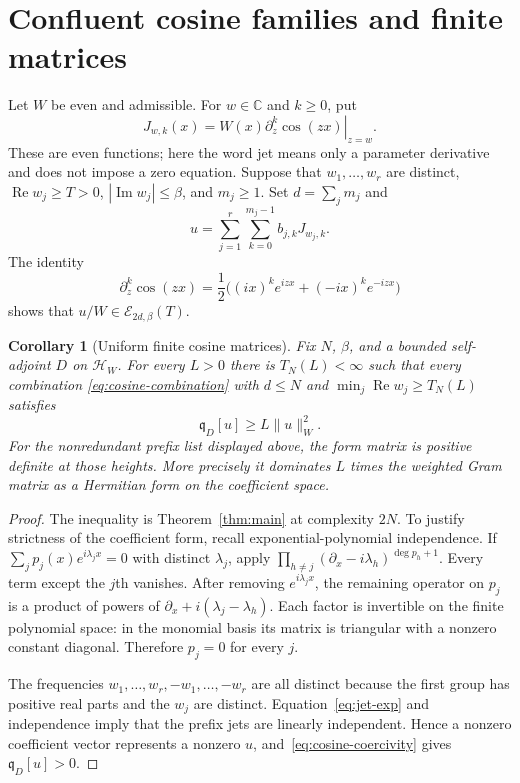 \documentclass[11pt]{article}
\newtheorem{corollary}[theorem]{Corollary}
\theoremstyle{definition}
\theoremstyle{remark}
\newcommand{\C}{\mathbb C}
\newcommand{\HH}{\mathcal H_W}
\newcommand{\qD}{\mathfrak q_D}
\newcommand{\norm}[1]{\lVert #1\rVert}
\DeclareMathOperator{\Rea}{Re}
\DeclareMathOperator{\Ima}{Im}
\begin{document}
\section{Confluent cosine families and finite matrices}\label{sec:cosine}

Let $W$ be even and admissible. For $w\in\C$ and $k\ge0$, put
\begin{equation}\label{eq:jets}
 J_{w,k}(x)=W(x)\left.\partial_z^k\cos(zx)\right|_{z=w}.
\end{equation}
These are even functions; here the word jet means only a parameter
derivative and does not impose a zero equation. Suppose that
$w_1,\ldots,w_r$ are distinct, $\Rea w_j\ge T>0$,
$|\Ima w_j|\le\beta$, and $m_j\ge1$. Set $d=\sum_jm_j$ and
\begin{equation}\label{eq:cosine-combination}
 u=\sum_{j=1}^r\sum_{k=0}^{m_j-1}b_{j,k}J_{w_j,k}.
\end{equation}
The identity
\begin{equation}\label{eq:jet-exp}
 \partial_z^k\cos(zx)=\frac12\bigl((ix)^ke^{izx}+(-ix)^ke^{-izx}\bigr)
\end{equation}
shows that $u/W\in\mathcal E_{2d,\beta}(T)$.

\begin{corollary}[Uniform finite cosine matrices]\label{cor:cosine}
Fix $N$, $\beta$, and a bounded self-adjoint $D$ on $\HH$. For every
$L>0$ there is $T_N(L)<\infty$ such that every combination
\eqref{eq:cosine-combination} with $d\le N$ and
$\min_j\Rea w_j\ge T_N(L)$ satisfies
\begin{equation}\label{eq:cosine-coercivity}
 \qD[u]\ge L\norm u_W^2.
\end{equation}
For the nonredundant prefix list displayed above, the form matrix is
positive definite at those heights. More precisely it dominates $L$ times
the weighted Gram matrix as a Hermitian form on the coefficient space.
\end{corollary}
\begin{proof}
The inequality is Theorem~\ref{thm:main} at complexity $2N$. To justify
strictness of the coefficient form, recall exponential-polynomial
independence. If $\sum_jp_j(x)e^{i\lambda_jx}=0$ with distinct
$\lambda_j$, apply
$\prod_{h\ne j}(\partial_x-i\lambda_h)^{\deg p_h+1}$.
Every term except the $j$th vanishes. After removing $e^{i\lambda_jx}$,
the remaining operator on $p_j$ is a product of powers of
$\partial_x+i(\lambda_j-\lambda_h)$.
Each factor is invertible on the finite polynomial space: in the monomial
basis its matrix is triangular with a nonzero constant diagonal.
Therefore $p_j=0$ for every $j$.

The frequencies $w_1,\ldots,w_r,-w_1,\ldots,-w_r$ are all distinct
because the first group has positive real parts and the $w_j$ are distinct.
Equation~\eqref{eq:jet-exp} and independence imply that the prefix jets
are linearly independent. Hence a nonzero coefficient vector represents a
nonzero $u$, and~\eqref{eq:cosine-coercivity} gives $\qD[u]>0$.
\end{proof}
\end{document}
